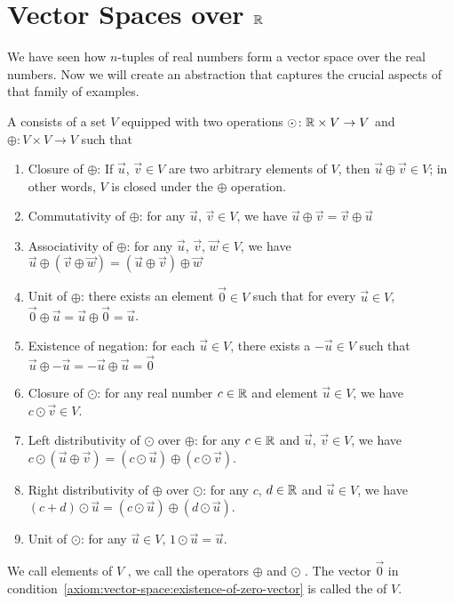 \section{Vector Spaces over \texorpdfstring{$\mathbb{R}$}{R}}

\M
We have seen how $n$-tuples of real numbers form a vector space over the
real numbers. Now we will create an abstraction that captures the
crucial aspects of that family of examples.

\begin{definition}
A  consists of a set $V$ equipped with two
operations $\odot\colon\mathbb{R}\times V\to V$ and $\oplus\colon V\times V\to V$
such that
\begin{enumerate}[label=(\arabic*)]
\item Closure of $\oplus$: If $\vec{u}$, $\vec{v}\in V$ are two arbitrary elements of $V$,
  then $\vec{u}\oplus\vec{v}\in V$; in other words, $V$ is closed under
  the $\oplus$ operation.
\item Commutativity of $\oplus$: for any $\vec{u}$, $\vec{v}\in V$,
  we have $\vec{u}\oplus\vec{v}=\vec{v}\oplus\vec{u}$
\item Associativity of $\oplus$: for any $\vec{u}$, $\vec{v}$, $\vec{w}\in V$,
  we have $\vec{u}\oplus(\vec{v}\oplus\vec{w})=(\vec{u}\oplus\vec{v})\oplus\vec{w}$
\item\label{axiom:vector-space:existence-of-zero-vector} Unit of $\oplus$: there exists an element $\vec{0}\in V$ such that
  for every $\vec{u}\in V$, $\vec{0}\oplus\vec{u}=\vec{u}\oplus\vec{0}=\vec{u}$.
\item Existence of negation: for each $\vec{u}\in V$, there exists a
  $-\vec{u}\in V$ such that $\vec{u}\oplus-\vec{u}=-\vec{u}\oplus\vec{u}=\vec{0}$
\item Closure of $\odot$: for any real number $c\in\mathbb{R}$ and element
  $\vec{u}\in V$, we have $c\odot\vec{v}\in V$.
\item Left distributivity of $\odot$ over $\oplus$:
  for any $c\in\mathbb{R}$ and $\vec{u}$, $\vec{v}\in V$, we have
  $c\odot(\vec{u}\oplus\vec{v}) = (c\odot\vec{u})\oplus(c\odot\vec{v})$.
\item Right distributivity of $\oplus$ over $\odot$:
  for any $c$, $d\in\mathbb{R}$ and $\vec{u}\in V$, we have
  $(c+d)\odot\vec{u} = (c\odot\vec{u})\oplus(d\odot\vec{u})$.
\item Unit of $\odot$: for any $\vec{u}\in V$, $1\odot\vec{u}=\vec{u}$.
\end{enumerate}
We call elements of $V$ , we call the operators $\oplus$
 and $\odot$ .
The vector $\vec{0}$ in condition~\ref{axiom:vector-space:existence-of-zero-vector}
is called the  of $V$.
\end{definition}


